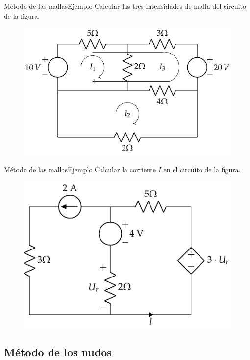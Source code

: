 \documentclass[aspectratio=169, xcolor={usenames,svgnames,dvipsnames}]{beamer}
\begin{document}
\begin{frame}{Método de las mallas}{Ejemplo}
    Calcular las tres intensidades de malla del circuito de la figura.
		\begin{figure}[H]
			\centering
			\includegraphics[]{../figs/ej5_BT1.pdf}
		\end{figure}
\end{frame}

\begin{frame}{Método de las mallas}{Ejemplo}
    Calcular la corriente $I$ en el circuito de la figura.
	    \begin{figure}[H]
	        \centering
	        \includegraphics{../figs/ejemplo_mallas_dependiente.pdf}
	    \end{figure}
\end{frame}

\subsection{Método de los nudos}
\end{document}
